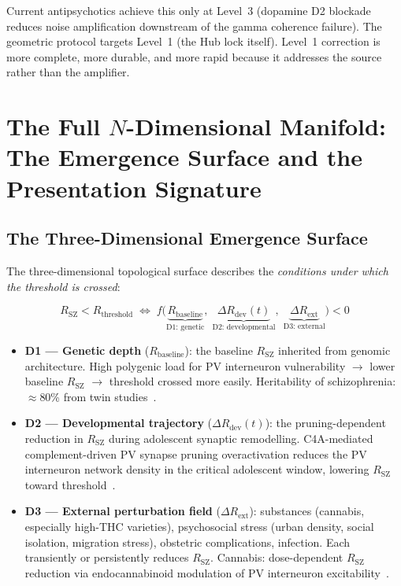 \documentclass[12pt,a4paper]{article}
\newcommand{\RSZ}{R_{\mathrm{SZ}}}
\begin{document}
Current antipsychotics achieve this only at Level~3
(dopamine D2 blockade reduces noise amplification downstream
of the gamma coherence failure). The geometric protocol
targets Level~1 (the Hub lock itself). Level~1 correction
is more complete, more durable, and more rapid because it
addresses the source rather than the amplifier.

\section{The Full \texorpdfstring{$N$}{N}-Dimensional Manifold:
The Emergence Surface and the Presentation Signature}

\subsection{The Three-Dimensional Emergence Surface}

The three-dimensional topological surface describes the
\emph{conditions under which the threshold is crossed}:

\begin{equation}
  \RSZ < R_{\mathrm{threshold}}
  \;\iff\;
  f\bigl(
    \underbrace{R_{\mathrm{baseline}}}_{\text{D1: genetic}},\;
    \underbrace{\Delta R_{\mathrm{dev}}(t)}_{\text{D2: developmental}},\;
    \underbrace{\Delta R_{\mathrm{ext}}}_{\text{D3: external}}
  \bigr) < 0
  \label{eq:emergence}
\end{equation}

\begin{itemize}
  \item \textbf{D1 --- Genetic depth} ($R_{\mathrm{baseline}}$):
    the baseline $\RSZ$ inherited from genomic architecture.
    High polygenic load for PV interneuron vulnerability
    $\to$ lower baseline $\RSZ$ $\to$ threshold crossed more
    easily. Heritability of schizophrenia: $\approx$80\%
    from twin studies~\cite{Sullivan2003}.

  \item \textbf{D2 --- Developmental trajectory}
    ($\Delta R_{\mathrm{dev}}(t)$): the pruning-dependent
    reduction in $\RSZ$ during adolescent synaptic
    remodelling. C4A-mediated complement-driven PV synapse
    pruning overactivation reduces the PV interneuron
    network density in the critical adolescent window,
    lowering $\RSZ$ toward threshold~\cite{Sekar2016}.

  \item \textbf{D3 --- External perturbation field}
    ($\Delta R_{\mathrm{ext}}$): substances (cannabis,
    especially high-THC varieties), psychosocial stress
    (urban density, social isolation, migration stress),
    obstetric complications, infection. Each
    transiently or persistently reduces $\RSZ$.
    Cannabis: dose-dependent $\RSZ$ reduction via
    endocannabinoid modulation of PV interneuron
    excitability~\cite{Murray2017}.
\end{itemize}
\end{document}
